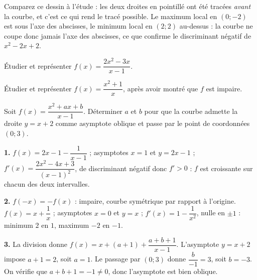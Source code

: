\begin{visualisation}
\begin{center}
\end{center}

Comparez ce dessin à l'étude : les deux droites en pointillé ont été tracées
\emph{avant} la courbe, et c'est ce qui rend le tracé possible. Le maximum
local en $(0;-2)$ est sous l'axe des abscisses, le minimum local en $(2;2)$
au-dessus : la courbe ne coupe donc jamais l'axe des abscisses, ce que
confirme le discriminant négatif de $x^{2}-2x+2$.
\end{visualisation}

\begin{entrainement}
\exo[\niveau{2}] Étudier et représenter $f(x) = \dfrac{2x^{2}-3x}{x-1}$.

\exo[\niveau{2}] Étudier et représenter $f(x) = \dfrac{x^{2}+1}{x}$, après
avoir montré que $f$ est impaire.

\exo[\niveau{3}] Soit $f(x) = \dfrac{x^{2}+ax+b}{x-1}$. Déterminer $a$ et $b$
pour que la courbe admette la droite $y = x+2$ comme asymptote oblique et
passe par le point de coordonnées $(0;3)$.
\end{entrainement}

\begin{corrige}
\textbf{1.} $f(x) = 2x-1-\dfrac{1}{x-1}$ ; asymptotes $x=1$ et $y=2x-1$ ;
$f'(x) = \dfrac{2x^{2}-4x+3}{(x-1)^{2}}$, de discriminant négatif donc $f'>0$ :
$f$ est croissante sur chacun des deux intervalles.

\textbf{2.} $f(-x) = -f(x)$ : impaire, courbe symétrique par rapport à
l'origine. $f(x) = x+\dfrac{1}{x}$ ; asymptotes $x=0$ et $y=x$ ;
$f'(x) = 1-\dfrac{1}{x^{2}}$, nulle en $\pm1$ : minimum $2$ en $1$, maximum
$-2$ en $-1$.

\textbf{3.} La division donne
$f(x) = x+(a+1)+\dfrac{a+b+1}{x-1}$. L'asymptote $y = x+2$ impose $a+1 = 2$,
soit $a = 1$. Le passage par $(0;3)$ donne $\dfrac{b}{-1} = 3$, soit
$b = -3$. On vérifie que $a+b+1 = -1 \neq 0$, donc l'asymptote est bien
oblique.
\end{corrige}

